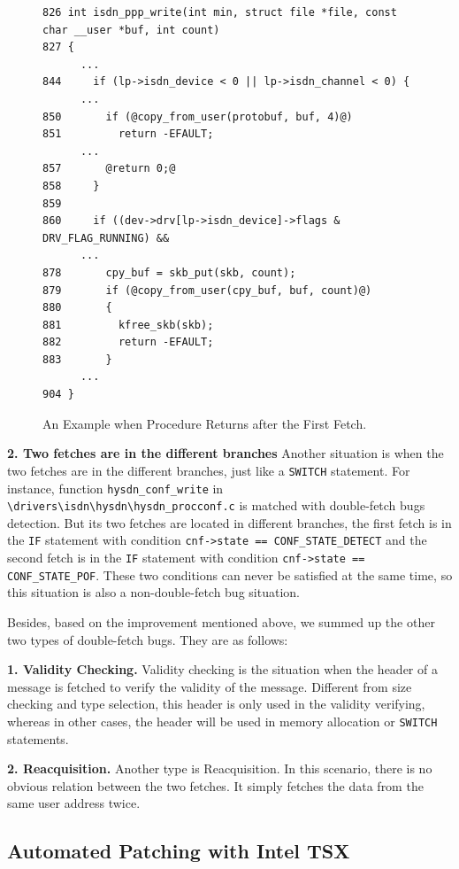 \documentclass[10pt]{llncs}
\begin{document}
\begin{figure}[t]
  \centering
\begin{lstlisting}[style=code]
826 int isdn_ppp_write(int min, struct file *file, const char __user *buf, int count)
827 {
	  ...
844     if (lp->isdn_device < 0 || lp->isdn_channel < 0) {
	  ...
850       if (@copy_from_user(protobuf, buf, 4)@)
851         return -EFAULT;
	  ...
857       @return 0;@
858     }
859 
860     if ((dev->drv[lp->isdn_device]->flags & DRV_FLAG_RUNNING) &&
	  ...
878       cpy_buf = skb_put(skb, count);
879       if (@copy_from_user(cpy_buf, buf, count)@)
880       {
881         kfree_skb(skb);
882         return -EFAULT;
883       }
	  ...
904 } 
\end{lstlisting}
  \caption{An Example when Procedure Returns after the First Fetch.}
  \label{return}
\end{figure}

\textbf{2. Two fetches are in the different branches}
Another situation is when the two fetches are in the different branches, just like a \verb:SWITCH: statement. For instance, function \verb:hysdn_conf_write: in \verb:\drivers\isdn\hysdn\hysdn_procconf.c: is matched with double-fetch bugs detection. But its two fetches are located in different branches, the first fetch is in the \verb:IF: statement with condition \texttt{cnf->state == CONF\_STATE\_DETECT} and the second fetch is in the \verb:IF: statement with condition \verb:cnf->state == CONF_STATE_POF:. These two conditions can never be satisfied at the same time, so this situation is also a non-double-fetch bug situation.

Besides, based on the improvement mentioned above, we summed up the other two types of double-fetch bugs. They are as follows:

\textbf{1. Validity Checking.}
Validity checking is the situation when the header of a message is fetched to verify the validity of the message. Different from size checking and type selection, this header is only used in the validity verifying, whereas in other cases, the header will be used in memory allocation or \verb:SWITCH: statements.

\textbf{2. Reacquisition.}
Another type is Reacquisition. In this scenario, there is no obvious relation between the two fetches. It simply fetches the data from the same user address twice.


\subsection{Automated Patching with Intel TSX}
\label{design2}
\end{document}
